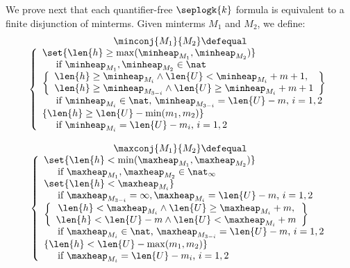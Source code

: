 We prove next that each quantifier-free $\seplogk{k}$ formula is
equivalent to a finite disjunction of minterms. Given minterms $M_1$
and $M_2$, we define:
\[\begin{array}{c}
\minconj{M_1}{M_2} \defequal \\ 
\left\{\begin{array}{l}
\set{\len{h} \geq \max(\minheap_{M_1},\minheap_{M_2})} \\
\hspace*{5mm} \text{if $\minheap_{M_1}, \minheap_{M_2} \in \nat$} \\
\left\{\begin{array}{l}
\len{h} \geq \minheap_{M_i} \wedge \len{U} < \minheap_{M_i}+m+1, \\
\len{h} \geq \minheap_{M_{3-i}} \wedge \len{U} \geq \minheap_{M_i}+m+1 
\end{array}\right\} \\ 
\hspace*{5mm} \text{if $\minheap_{M_i} \in \nat$, $\minheap_{M_{3-i}} = \len{U}-m$, $i=1,2$} \\
\{ \len{h} \geq \len{U} - \min(m_1,m_2) \} \\ 
\hspace*{5mm}\text{if $\minheap_{M_i} = \len{U}-m_i$, $i=1,2$}
\end{array}\right. 
\\\\
\maxconj{M_1}{M_2} \defequal \\ 
\left\{\begin{array}{ll}
\set{\len{h} < \min(\maxheap_{M_1},\maxheap_{M_2})} \\
\hspace*{5mm}\text{if $\maxheap_{M_1}, \maxheap_{M_2} \in \nat_{\infty}$} \\
\set{\len{h} < \maxheap_{M_i}} \\
\hspace*{5mm}\text{if $\maxheap_{M_{3-i}} = \infty, \maxheap_{M_i} = \len{U}-m$, $i=1,2$} \\
\left\{\begin{array}{c}
\len{h} < \maxheap_{M_i} \wedge \len{U} \geq \maxheap_{M_i} + m, \\
\len{h} < \len{U}-m \wedge \len{U} < \maxheap_{M_i} + m
\end{array}\right\} \\ 
\hspace*{5mm}\text{if $\maxheap_{M_i} \in \nat$, $\maxheap_{M_{3-i}} = \len{U}-m$, $i=1,2$} \\
\{ \len{h} < \len{U}-\max(m_1,m_2) \} \\
\hspace*{5mm}\text{if $\maxheap_{M_i} = \len{U}-m_i$, $i=1,2$}
\end{array}\right.
\end{array}\]
